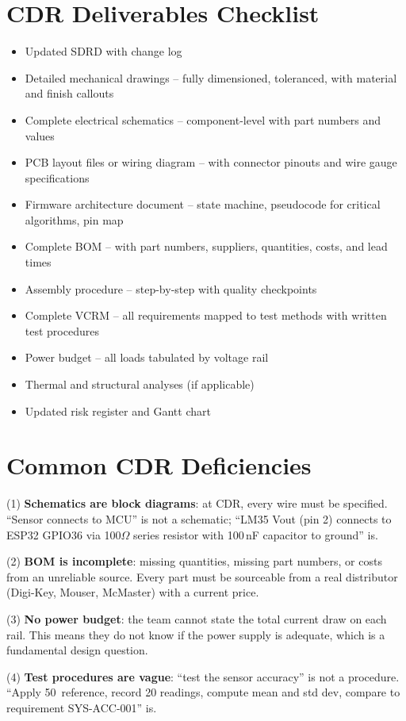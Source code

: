 \section{CDR Deliverables Checklist}
\begin{itemize}[nosep,leftmargin=1.5em]
\item Updated SDRD with change log
\item Detailed mechanical drawings -- fully dimensioned, toleranced, with material and finish callouts
\item Complete electrical schematics -- component-level with part numbers and values
\item PCB layout files or wiring diagram -- with connector pinouts and wire gauge specifications
\item Firmware architecture document -- state machine, pseudocode for critical algorithms, pin map
\item Complete BOM -- with part numbers, suppliers, quantities, costs, and lead times
\item Assembly procedure -- step-by-step with quality checkpoints
\item Complete VCRM -- all requirements mapped to test methods with written test procedures
\item Power budget -- all loads tabulated by voltage rail
\item Thermal and structural analyses (if applicable)
\item Updated risk register and Gantt chart
\end{itemize}

\section{Common CDR Deficiencies}
(1) \textbf{Schematics are block diagrams}: at CDR, every wire must be specified. ``Sensor connects to MCU'' is not a schematic; ``LM35 Vout (pin 2) connects to ESP32 GPIO36 via 100$\Omega$ series resistor with 100\,nF capacitor to ground'' is.

(2) \textbf{BOM is incomplete}: missing quantities, missing part numbers, or costs from an unreliable source. Every part must be sourceable from a real distributor (Digi-Key, Mouser, McMaster) with a current price.

(3) \textbf{No power budget}: the team cannot state the total current draw on each rail. This means they do not know if the power supply is adequate, which is a fundamental design question.

(4) \textbf{Test procedures are vague}: ``test the sensor accuracy'' is not a procedure. ``Apply 50\,\degC{} reference, record 20 readings, compute mean and std dev, compare to requirement SYS-ACC-001'' is.

